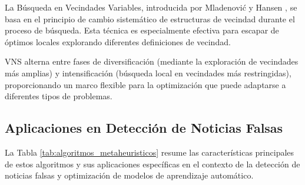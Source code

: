 La Búsqueda en Vecindades Variables, introducida por Mladenović y Hansen \cite{mladenovic1997variable}, se basa en el principio de cambio sistemático de estructuras de vecindad durante el proceso de búsqueda. Esta técnica es especialmente efectiva para escapar de óptimos locales explorando diferentes definiciones de vecindad.

VNS alterna entre fases de diversificación (mediante la exploración de vecindades más amplias) y intensificación (búsqueda local en vecindades más restringidas), proporcionando un marco flexible para la optimización que puede adaptarse a diferentes tipos de problemas.

\subsection{Aplicaciones en Detección de Noticias Falsas}

La Tabla \ref{tab:algoritmos_metaheuristicos} resume las características principales de estos algoritmos y sus aplicaciones específicas en el contexto de la detección de noticias falsas y optimización de modelos de aprendizaje automático.

